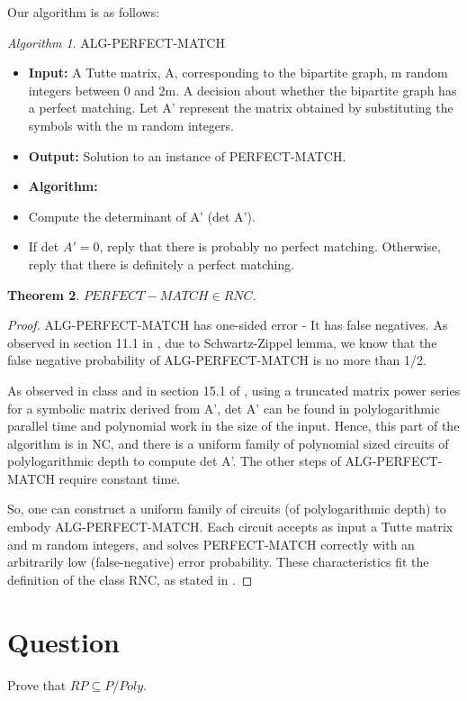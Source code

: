\documentclass[10pt]{amsart}
\newtheorem{thm}{Theorem}[subsection]
\theoremstyle{remark}
\newtheorem{alg}[thm]{Algorithm}
\begin{document}
Our algorithm is as follows:
\begin{alg}{ALG-PERFECT-MATCH}

\begin{itemize}
\item \textbf{Input:} A Tutte matrix, A, corresponding to the bipartite graph, m random integers between 0 and 2m. A decision about whether the bipartite graph has a perfect matching.
Let A' represent the matrix obtained by substituting the symbols with the m random integers.
\item \textbf{Output:} Solution to an instance of PERFECT-MATCH.
\item \textbf{Algorithm:}
\item Compute the determinant of A' (det A').
\item If det $A' = 0$, reply that there is probably no perfect matching. Otherwise, reply that there is definitely a perfect matching.
\end{itemize}
\end{alg}

\begin{thm}
$PERFECT-MATCH \in RNC$.
\end{thm}
\begin{proof}
ALG-PERFECT-MATCH has one-sided error - It has false negatives. As observed in section 11.1 in \cite{papadimitriouCC}, due to Schwartz-Zippel lemma, we know that the false negative probability of ALG-PERFECT-MATCH is no more than 1/2.

As observed in class and in section 15.1 of \cite{papadimitriouCC}, using a truncated matrix power series for a symbolic matrix derived from A', det A' can be found in polylogarithmic parallel time and polynomial work in the size of the input. Hence, this part of the algorithm is in NC, and there is a uniform family of polynomial sized circuits of polylogarithmic depth to compute det A'. The other steps of ALG-PERFECT-MATCH require constant time.

So, one can construct a uniform family of circuits (of polylogarithmic depth) to embody ALG-PERFECT-MATCH. Each circuit accepts as input a Tutte matrix and m random integers, and solves PERFECT-MATCH correctly with an arbitrarily low (false-negative) error probability. These characteristics fit the definition of the class RNC, as stated in \cite{papadimitriouCC}.
\end{proof}

\section{Question}
Prove that $RP \subseteq P/Poly$.
\end{document}
